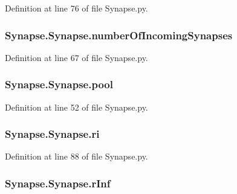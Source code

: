 Definition at line 76 of file Synapse.\-py.

\hypertarget{class_synapse_1_1_synapse_a6e55e008336cc47551669f3d77248d57}{
\subsubsection[{number\-Of\-Incoming\-Synapses}]{\setlength{\rightskip}{0pt plus 5cm}Synapse.\-Synapse.\-number\-Of\-Incoming\-Synapses}}\label{class_synapse_1_1_synapse_a6e55e008336cc47551669f3d77248d57}


Definition at line 67 of file Synapse.\-py.

\hypertarget{class_synapse_1_1_synapse_a133990bf3ab7f1efa8b416be73d07a11}{
\subsubsection[{pool}]{\setlength{\rightskip}{0pt plus 5cm}Synapse.\-Synapse.\-pool}}\label{class_synapse_1_1_synapse_a133990bf3ab7f1efa8b416be73d07a11}


Definition at line 52 of file Synapse.\-py.

\hypertarget{class_synapse_1_1_synapse_adc85234a081ad18bf19473be530dcf78}{
\subsubsection[{ri}]{\setlength{\rightskip}{0pt plus 5cm}Synapse.\-Synapse.\-ri}}\label{class_synapse_1_1_synapse_adc85234a081ad18bf19473be530dcf78}


Definition at line 88 of file Synapse.\-py.

\hypertarget{class_synapse_1_1_synapse_afd263d49a97910efd8955a2aadef50e0}{
\subsubsection[{r\-Inf}]{\setlength{\rightskip}{0pt plus 5cm}Synapse.\-Synapse.\-r\-Inf}}\label{class_synapse_1_1_synapse_afd263d49a97910efd8955a2aadef50e0}


